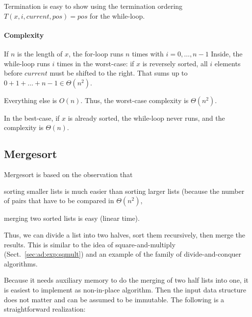 Termination is easy to show using the termination ordering $T(x,i,current,pos)=pos$ for the while-loop.

\paragraph{Complexity}
If $n$ is the length of $x$, the for-loop runs $n$ times with $i=0,\ldots,n-1$
Inside, the while-loop runs $i$ times in the worst-case: if $x$ is reversely sorted, all $i$ elements before $current$ must be shifted to the right.
That sums up to $0+1+\ldots+n-1\in \Theta(n^2)$.

Everything else is $O(n)$.
Thus, the worst-case complexity is $\Theta(n^2)$.

In the best-case, if $x$ is already sorted, the while-loop never runs, and the complexity is $\Theta(n)$.

\subsection{Mergesort}\label{sec:ad:sort:merge}

Mergesort is based on the observation that
\begin{compactitem}
  \item sorting smaller lists is much easier than sorting larger lists (because the number of pairs that have to be compared in $\Theta(n^2)$,
  \item merging two sorted lists is easy (linear time).
\end{compactitem}
Thus, we can divide a list into two halves, sort them recursively, then merge the results.
This is similar to the idea of square-and-multiply (Sect.~\ref{sec:ad:exp:sqmult}) and an example of the family of divide-and-conquer algorithms.

Because it needs auxiliary memory to do the merging of two half lists into one, it is easiest to implement as non-in-place algorithm.
Then the input data structure does not matter and can be assumed to be immutable.
The following is a straightforward realization:

